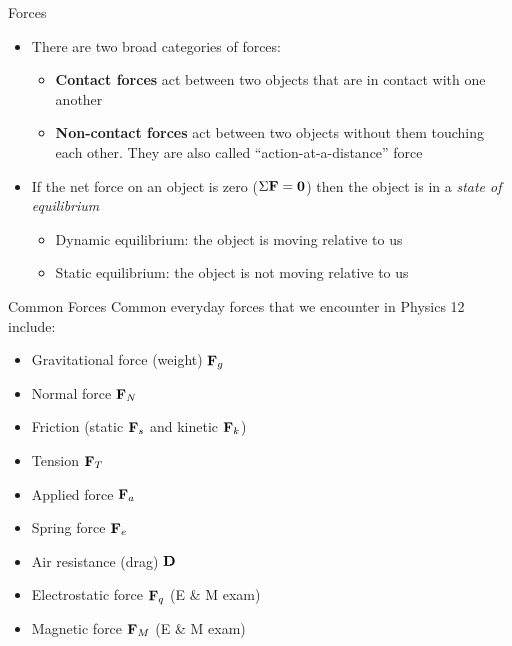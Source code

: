 \documentclass[12pt,compress,aspectratio=169]{beamer}
\newcommand{\mb}[1]{\ensuremath\mathbf{#1}}
\begin{document}
\begin{frame}{Forces}
  \begin{itemize}
  \item There are two broad categories of forces:
    \begin{itemize}
    \item\textbf{Contact forces} act between two objects that are in contact
      with one another
    \item\textbf{Non-contact forces} act between two objects without them
      touching each other. They are also called ``action-at-a-distance'' force
    \end{itemize}
    
  \item If the net force on an object is zero ($\Sigma\mb{F}=\mb{0}$) then the
    object is in a \emph{state of equilibrium}
    \begin{itemize}
    \item Dynamic equilibrium: the object is moving relative to us
    \item Static equilibrium: the object is not moving relative to us
    \end{itemize}  
  \end{itemize}
\end{frame}



\begin{frame}{Common Forces}
  Common everyday forces that we encounter in Physics 12 include:
  \begin{itemize}
  \item Gravitational force (weight) $\mb{F}_g$
  \item Normal force $\mb{F}_N$
  \item Friction (static $\mb{F}_s$ and kinetic $\mb{F}_k$)
  \item Tension $\mb{F}_T$
  \item Applied force $\mb{F}_a$
  \item Spring force $\mb{F}_e$
  \item Air resistance (drag) $\mb{D}$
  \item Electrostatic force $\mb{F}_q$ (E \& M exam)
  \item Magnetic force $\mb{F}_M$ (E \& M exam)
  \end{itemize}
\end{frame}
\end{document}
